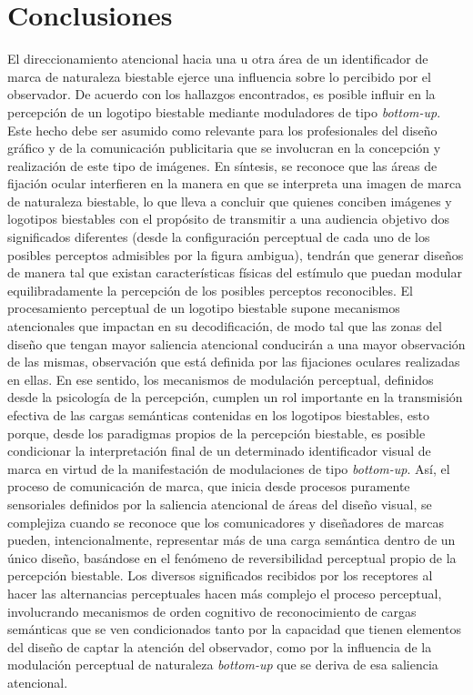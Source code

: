 \documentclass[spanish]{textolivre}
\begin{document}
\section{Conclusiones}\label{sec-organizacao-latex}
El direccionamiento atencional hacia una u otra área de un identificador de marca de naturaleza biestable ejerce una influencia sobre lo percibido por el observador. De acuerdo con los hallazgos encontrados, es posible influir en la percepción de un logotipo biestable mediante moduladores de tipo \textit{bottom-up}. Este hecho debe ser asumido como relevante para los profesionales del diseño gráfico y de la comunicación publicitaria que se involucran en la concepción y realización de este tipo de imágenes. En síntesis, se reconoce que las áreas de fijación ocular interfieren en la manera en que se interpreta una imagen de marca de naturaleza biestable, lo que lleva a concluir que quienes conciben imágenes y logotipos biestables con el propósito de transmitir a una audiencia objetivo dos significados diferentes (desde la configuración perceptual de cada uno de los posibles perceptos admisibles por la figura ambigua), tendrán que generar diseños de manera tal que existan características físicas del estímulo que puedan modular equilibradamente la percepción de los posibles perceptos reconocibles. El procesamiento perceptual de un logotipo biestable supone mecanismos atencionales que impactan en su decodificación, de modo tal que las zonas del diseño que tengan mayor saliencia atencional conducirán a una mayor observación de las mismas, observación que está definida por las fijaciones oculares realizadas en ellas. En ese sentido, los mecanismos de modulación perceptual, definidos desde la psicología de la percepción, cumplen un rol importante en la transmisión efectiva de las cargas semánticas contenidas en los logotipos biestables, esto porque, desde los paradigmas propios de la percepción biestable, es posible condicionar la interpretación final de un determinado identificador visual de marca en virtud de la manifestación de modulaciones de tipo \textit{bottom-up}. Así, el proceso de comunicación de marca, que inicia desde procesos puramente sensoriales definidos por la saliencia atencional de áreas del diseño visual, se complejiza cuando se reconoce que los comunicadores y diseñadores de marcas pueden, intencionalmente, representar más de una carga semántica dentro de un único diseño, basándose en el fenómeno de reversibilidad perceptual propio de la percepción biestable. Los diversos significados recibidos por los receptores al hacer las alternancias perceptuales hacen más complejo el proceso perceptual, involucrando mecanismos de orden cognitivo de reconocimiento de cargas semánticas que se ven condicionados tanto por la capacidad que tienen elementos del diseño de captar la atención del observador, como por la influencia de la modulación perceptual de naturaleza \textit{bottom-up} que se deriva de esa saliencia atencional.
\end{document}
